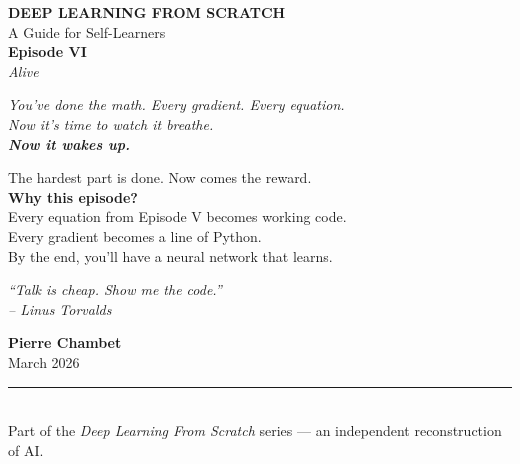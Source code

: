 \documentclass[11pt]{article}
\begin{document}
\begin{titlepage}
    \centering
    \vspace*{2.2cm}

    {\Large \textbf{DEEP LEARNING FROM SCRATCH}}\\[0.4em]
    A Guide for Self-Learners\\[2.5em]

    {\Huge \bfseries Episode VI}\\[0.4em]
    {\LARGE \textit{Alive}}\\[2em]

    \vspace{0.8cm}

    {\large\itshape
    You've done the math. Every gradient. Every equation.\\
    Now it's time to watch it breathe.\\[0.8em]
    {\Large \textbf{Now it wakes up.}}
    }

    \vspace{0.8cm}

    \begin{tcolorbox}[colback=black!3!white, colframe=black!20!white, width=0.8\textwidth, sharp corners, boxrule=0.4pt]
    \centering
    \itshape

    {\Large The hardest part is done. Now comes the reward.}\\[1em]

    \textbf{Why this episode?}\\[0.3em]
    Every equation from Episode V becomes working code.\\
    Every gradient becomes a line of Python.\\
    By the end, you'll have a neural network that learns.
    \end{tcolorbox}

    \vspace{1.5cm}

    \begin{center}
    \itshape
        {\Large \textit{``Talk is cheap. Show me the code.''}}\\
        \vspace{0.2em}
        {\large -- Linus Torvalds}
    \end{center}

    \vfill

    {\large \textbf{Pierre Chambet}}\\[0.3em]
    {\small March 2026}\\[1em]
    \rule{0.8\textwidth}{0.4pt}\\[0.4em]
    {\small Part of the \textit{Deep Learning From Scratch} series --- an independent reconstruction of AI.}

\end{titlepage}
\end{document}
